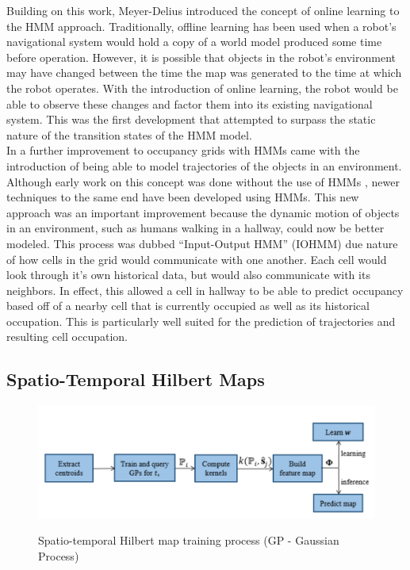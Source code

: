   Building on this work, Meyer-Delius \cite{Meyer-Delius2012} introduced the concept of online
  learning to the HMM approach. Traditionally, offline learning has been used when
  a robot's navigational system would hold a copy of a world model produced some
  time before operation. However, it is possible that objects in the robot's
  environment may have changed between the time the map was generated to the
  time at which the robot operates. With the introduction of online learning, the
  robot would be able to observe these changes and factor them into its existing
  navigational system. This was the first development that attempted to surpass the static
  nature of the transition states of the HMM model. \\

  In \cite{Wang2015} a further improvement to occupancy grids with HMMs came with the introduction of
  being able to model trajectories of the objects in an environment.
  Although early work on this concept was done without the use of HMMs
  \cite{Kucner2013}, newer techniques to the same end have been developed using HMMs.
  This new approach was an important improvement because the
  dynamic motion of objects in an environment, such as humans walking in a
  hallway, could now be better modeled. This process was dubbed ``Input-Output
  HMM'' (IOHMM) due nature of how cells in the grid would communicate with one
  another. Each cell would look through it's own historical data, but would
  also communicate with its neighbors. In effect, this allowed
  a cell in hallway to be able to predict occupancy based off of a nearby cell
  that is currently occupied as well as its historical occupation. This is particularly
  well suited for the prediction of trajectories and resulting cell occupation. \\

  \subsection{ Spatio-Temporal Hilbert Maps }

  \begin{figure}[!htb]
    \centering
    \includegraphics[width=\linewidth]{images/STHM_diag.png}
    \caption{Spatio-temporal Hilbert map training process (GP - Gaussian Process)}
    \cite{Senanayake2016}
    \label{figure:STHM}
  \end{figure}

